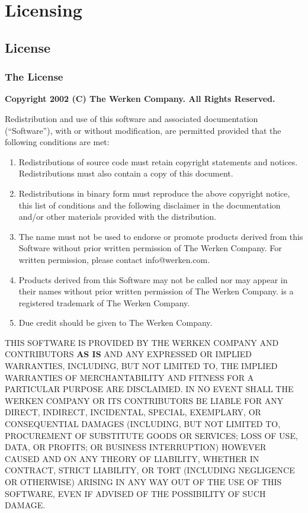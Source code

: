 \chapter{Licensing}

\section{\drools{} License}

\subsection{The License}

\small

{\center \textbf{\textsf{Copyright 2002 (C) The Werken Company. All Rights Reserved.}}\\}

\bigskip

Redistribution and use of this software and associated documentation
(``Software''), with or without modification, are permitted provided
that the following conditions are met:

\begin{enumerate}
	\item Redistributions of source code must retain copyright
   statements and notices.  Redistributions must also contain a
   copy of this document.
 
	\item Redistributions in binary form must reproduce the
   above copyright notice, this list of conditions and the
   following disclaimer in the documentation and/or other
   materials provided with the distribution.
 
	\item The name \drools{} must not be used to endorse or promote
   products derived from this Software without prior written
   permission of The Werken Company.  For written permission,
   please contact info@werken.com.
 
	\item Products derived from this Software may not be called \drools{}
   nor may \drools{} appear in their names without prior written
   permission of The Werken Company. \drools{} is a registered
   trademark of The Werken Company.
 
	\item Due credit should be given to The Werken Company. 
\end{enumerate}
 
THIS SOFTWARE IS PROVIDED BY THE WERKEN COMPANY AND CONTRIBUTORS
\textbf{AS IS} AND ANY EXPRESSED OR IMPLIED WARRANTIES, INCLUDING, BUT
NOT LIMITED TO, THE IMPLIED WARRANTIES OF MERCHANTABILITY AND
FITNESS FOR A PARTICULAR PURPOSE ARE DISCLAIMED.  IN NO EVENT SHALL
THE WERKEN COMPANY OR ITS CONTRIBUTORS BE LIABLE FOR ANY DIRECT,
INDIRECT, INCIDENTAL, SPECIAL, EXEMPLARY, OR CONSEQUENTIAL DAMAGES
(INCLUDING, BUT NOT LIMITED TO, PROCUREMENT OF SUBSTITUTE GOODS OR
SERVICES; LOSS OF USE, DATA, OR PROFITS; OR BUSINESS INTERRUPTION)
HOWEVER CAUSED AND ON ANY THEORY OF LIABILITY, WHETHER IN CONTRACT,
STRICT LIABILITY, OR TORT (INCLUDING NEGLIGENCE OR OTHERWISE)
ARISING IN ANY WAY OUT OF THE USE OF THIS SOFTWARE, EVEN IF ADVISED
OF THE POSSIBILITY OF SUCH DAMAGE.

